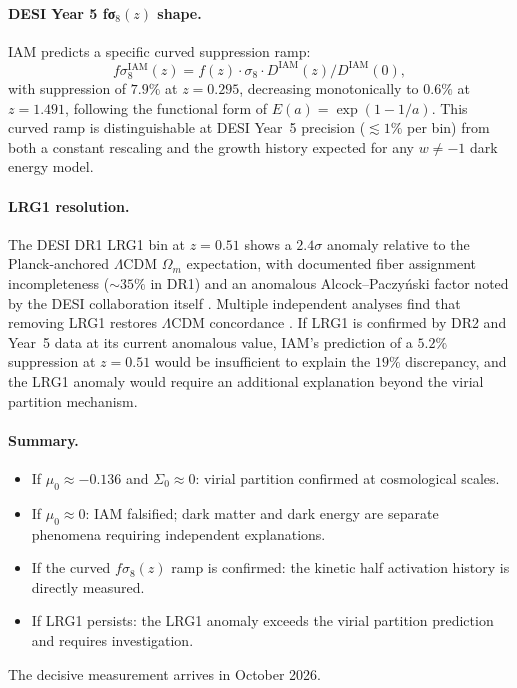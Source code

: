 \documentclass[12pt,a4paper]{article}
\begin{document}
\paragraph{DESI Year 5 fσ$_8(z)$ shape.}
IAM predicts a specific curved suppression ramp:
\begin{equation}
  f\sigma_8^\mathrm{IAM}(z) = f(z) \cdot \sigma_8 \cdot D^\mathrm{IAM}(z) / D^\mathrm{IAM}(0),
\end{equation}
with suppression of $7.9\%$ at $z = 0.295$, decreasing monotonically to
$0.6\%$ at $z = 1.491$, following the functional form of $E(a) =
\exp(1 - 1/a)$. This curved ramp is distinguishable at DESI Year~5 precision
($\lesssim 1\%$ per bin) from both a constant rescaling and the growth history
expected for any $w \neq -1$ dark energy model.

\paragraph{LRG1 resolution.}
The DESI DR1 LRG1 bin at $z = 0.51$ shows a $2.4\sigma$ anomaly relative to
the Planck-anchored $\Lambda$CDM $\Omega_m$ expectation, with documented fiber
assignment incompleteness ($\sim 35\%$ in DR1) and an anomalous
Alcock--Paczy\'{n}ski factor noted by the DESI collaboration itself
\citep{desi2025_vi}. Multiple independent analyses find that removing LRG1
restores $\Lambda$CDM concordance \citep{ocolgain2025,liu2024}. If LRG1 is
confirmed by DR2 and Year~5 data at its current anomalous value, IAM's
prediction of a $5.2\%$ suppression at $z = 0.51$ would be insufficient to
explain the $19\%$ discrepancy, and the LRG1 anomaly would require an
additional explanation beyond the virial partition mechanism.

\paragraph{Summary.}
\begin{itemize}
  \item If $\mu_0 \approx -0.136$ and $\Sigma_0 \approx 0$: virial partition
  confirmed at cosmological scales.
  \item If $\mu_0 \approx 0$: IAM falsified; dark matter and dark energy are
  separate phenomena requiring independent explanations.
  \item If the curved $f\sigma_8(z)$ ramp is confirmed: the kinetic half
  activation history is directly measured.
  \item If LRG1 persists: the LRG1 anomaly exceeds the virial partition
  prediction and requires investigation.
\end{itemize}
The decisive measurement arrives in October 2026.
\end{document}
